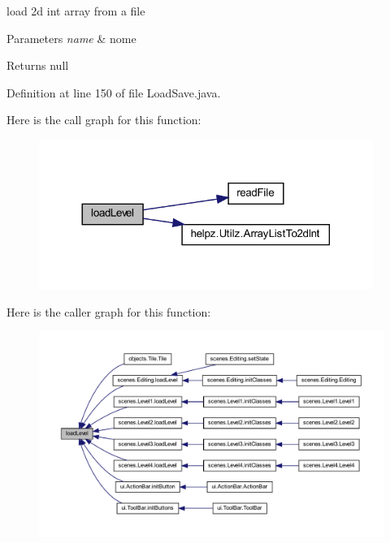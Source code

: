 load 2d int array from a file 


\begin{DoxyParams}{Parameters}
{\em name} & nome \\
\hline
\end{DoxyParams}
\begin{DoxyReturn}{Returns}
null 
\end{DoxyReturn}


Definition at line 150 of file Load\+Save.\+java.

Here is the call graph for this function\+:\nopagebreak
\begin{figure}[H]
\begin{center}
\leavevmode
\includegraphics[width=308pt]{classhelpz_1_1_load_save_a9dbd50db72db31e6a9c5c423d4e48be3_cgraph}
\end{center}
\end{figure}
Here is the caller graph for this function\+:\nopagebreak
\begin{figure}[H]
\begin{center}
\leavevmode
\includegraphics[width=350pt]{classhelpz_1_1_load_save_a9dbd50db72db31e6a9c5c423d4e48be3_icgraph}
\end{center}
\end{figure}
\mbox{\label{classhelpz_1_1_load_save_a62d3bd4e3f361e1f99bd9d21a7d21b0d}} 
